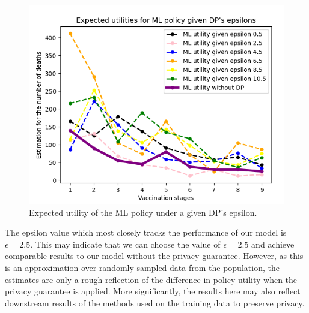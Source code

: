 \documentclass{article}
\begin{document}
\begin{itemize}
\begin{figure}[H]
    \includegraphics[width=12cm]{line_plot2.png}
    \centering
    \caption{Expected utility of the ML policy under a given DP's epsilon.}
    \label{fig:2}
\end{figure}

The epsilon value which most closely tracks the performance of our model is $\epsilon = 2.5$. This may indicate that we can choose the value of $\epsilon = 2.5$ and achieve comparable results to our model without the privacy guarantee. However, as this is an approximation over randomly sampled data from the population, the estimates are only a rough reflection of the difference in policy utility when the privacy guarantee is applied. More significantly, the results here may also reflect downstream results of the methods used on the training data to preserve privacy.






\end{itemize}
\end{document}
